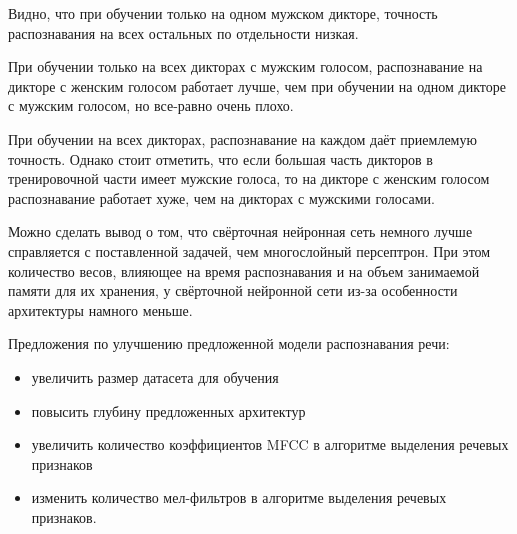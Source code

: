 Видно, что при обучении только на одном мужском дикторе, точность распознавания на всех остальных по отдельности низкая. 

При обучении только на всех дикторах с мужским голосом, распознавание на дикторе с женским голосом работает лучше, чем при обучении на одном дикторе с мужским голосом, но все-равно очень плохо.

При обучении на всех дикторах, распознавание на каждом даёт приемлемую точность. Однако стоит отметить, что если большая часть дикторов в тренировочной части имеет мужские голоса, то на дикторе с женским голосом распознавание работает хуже, чем на дикторах с мужскими голосами.

Можно сделать вывод о том, что свёрточная нейронная сеть немного лучше справляется с поставленной задачей, чем многослойный персептрон. При этом количество весов, влияющее на время распознавания и на объем занимаемой памяти для их хранения, у свёрточной нейронной сети из-за особенности архитектуры намного меньше.

Предложения по улучшению предложенной модели распознавания речи:
\begin{itemize}[leftmargin=2cm]
	\item увеличить размер датасета для обучения
	\item повысить глубину предложенных архитектур
	\item увеличить количество коэффициентов MFCC в алгоритме выделения речевых признаков
	\item изменить количество мел-фильтров в алгоритме выделения речевых признаков.
\end{itemize}